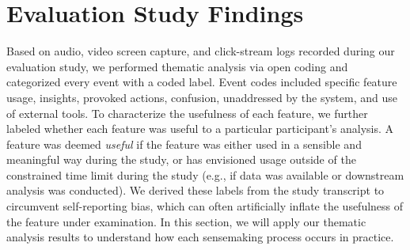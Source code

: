 \section{Evaluation Study Findings\label{sec:eval_findings}}
Based on audio, video screen capture,
and click-stream logs recorded
during our evaluation study,
we performed thematic analysis via open coding
and categorized every event with a coded label.
Event codes included specific feature usage,
insights,
provoked actions, confusion,
 unaddressed
by the system, and use of external tools. To characterize the usefulness
of each feature, we further labeled whether each
feature was useful to a particular participant's analysis.
A feature was deemed \textit{useful}
if the feature was either used in a sensible
and meaningful way during the study,
or has envisioned usage outside of the constrained
time limit during the study
(e.g., if data was available or downstream analysis was conducted).
We derived these labels from the study transcript
to circumvent self-reporting bias,
which can often artificially inflate
the usefulness of the feature under examination.
In this section, we will apply our thematic analysis results to understand how each sensemaking process occurs in practice.%
